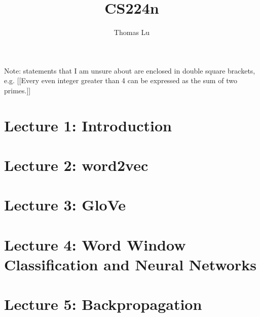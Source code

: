 \documentclass{article}
\title{CS224n}
\author{Thomas Lu}
\date{}
\begin{document}
\maketitle
Note: statements that I am unsure about are enclosed in double square brackets, e.g. [[Every even integer greater than 4 can be expressed as the sum of two primes.]]
\section{Lecture 1: Introduction}

\section{Lecture 2: word2vec}

\section{Lecture 3: GloVe}

\section{Lecture 4: Word Window Classification and Neural Networks}

\section{Lecture 5: Backpropagation}

\end{document}
